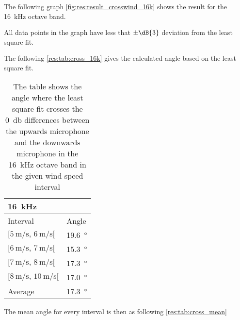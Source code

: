  The following graph \autoref{fig:res:result_crosswind_16k} shows the result for the \SI{16}{\kilo\hertz} octave band. 
 

 All data points in the graph have less that $\pm \dB{3}$ deviation from the least square fit.
 
 The following \autoref{res:tab:cross_16k} gives the calculated angle based on the least square fit.  
  
 \begin{table}[H]
 \centering
  \caption{The table shows the angle where the least square fit crosses the \SI{0}{\decibel} differences between the upwards microphone and the downwards microphone in the \SI{16}{\kilo\hertz} octave band in the given wind speed interval}
\begin{tabular}{l|l}
\multicolumn{2}{l}{\SI{16}{\kilo\hertz}}      \\ \hline
Interval & Angle \\ \hline
  $[\SI{5}{\meter\per\second},\, \SI{6}{\meter\per\second}[ $       &   \SI{19.6}{\degree}    \\
    $[\SI{6}{\meter\per\second},\, \SI{7}{\meter\per\second}[ $     &   \SI{15.3}{\degree}     \\
  $[\SI{7}{\meter\per\second},\, \SI{8}{\meter\per\second}[ $       &    \SI{17.3}{\degree}    \\
   $[\SI{8}{\meter\per\second},\, \SI{10}{\meter\per\second}[ $      &     \SI{17.0}{\degree}  \\ \hline
    Average      &     \SI{17.3}{\degree} 
\end{tabular}
\label{res:tab:cross_16k}
\end{table}    
 
 
The mean angle for every interval is then as following \autoref{res:tab:cross_mean}


